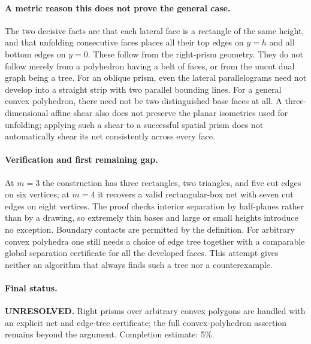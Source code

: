 \documentclass[11pt,a4paper]{article}
\begin{document}
\paragraph{A metric reason this does not prove the general case.}
The two decisive facts are that each lateral face is a rectangle of the
same height, and that unfolding consecutive faces places all their top edges
on $y=h$ and all bottom edges on $y=0$. These follow from the right-prism
geometry. They do not follow merely from a polyhedron having a belt of faces,
or from the uncut dual graph being a tree. For an oblique prism, even the
lateral parallelograms need not develop into a straight strip with two
parallel bounding lines. For a general convex polyhedron, there need not
be two distinguished base faces at all. A three-dimensional affine shear
also does not preserve the planar isometries used for unfolding; applying
such a shear to a successful spatial prism does not automatically shear its
net consistently across every face.

\paragraph{Verification and first remaining gap.}
At $m=3$ the construction has three rectangles, two triangles, and five cut
edges on six vertices; at $m=4$ it recovers a valid rectangular-box net with
seven cut edges on eight vertices. The proof checks interior separation by
half-planes rather than by a drawing, so extremely thin bases and large or
small heights introduce no exception. Boundary contacts are permitted by
the definition. For arbitrary convex polyhedra one still needs a choice of
edge tree together with a comparable global separation certificate for all
the developed faces. This attempt gives neither an algorithm that always
finds such a tree nor a counterexample.

\paragraph{Final status.}
\textbf{UNRESOLVED.} Right prisms over arbitrary convex polygons are handled
with an explicit net and edge-tree certificate; the full convex-polyhedron
assertion remains beyond the argument. Completion estimate: 5\%.
\end{document}
